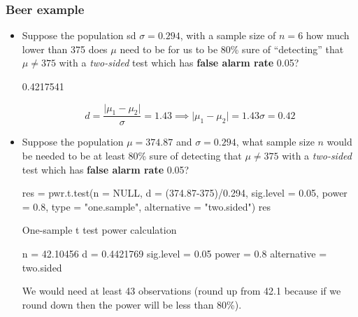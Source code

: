 \documentclass[a4paper]{article}\usepackage[]{graphicx}\usepackage[]{xcolor}
\begin{document}
\subsubsection{Beer example}
\begin{itemize}
	\item Suppose the population sd \( \sigma = 0.294 \), with a sample size of \( n = 6 \) how much lower than 375 does \textcolor{myred}{\( \mu \)} need to be for us to be 80\% sure of ``detecting'' that \textcolor{myred}{\( \mu \neq 375 \)} with a \textit{two-sided} test which has \textbf{false alarm rate} 0.05?
\begin{Schunk}
\begin{Soutput}
[1] 0.4217541
\end{Soutput}
\end{Schunk}
\[
	d = \frac{\lvert \mu_1 - \mu_2 \rvert}{\sigma} = 1.43 \implies \lvert \mu_1 - \mu_2 \rvert = 1.43\sigma = 0.42
\]
	\item Suppose the population  \textcolor{myred}{\( \mu = 374.87 \)} and \( \sigma = 0.294 \), what sample size \( n \) would be needed to be at least 80\% sure of detecting that \( \mu \neq 375 \) with a \textit{two-sided} test which has \textbf{false alarm rate} 0.05?
\begin{Schunk}
\begin{Sinput}
res = pwr.t.test(n = NULL,
                 d = (374.87-375)/0.294, 
                 sig.level = 0.05,
                 power = 0.8, 
                 type = "one.sample", 
                 alternative = "two.sided")
res
\end{Sinput}
\begin{Soutput}

     One-sample t test power calculation 

              n = 42.10456
              d = 0.4421769
      sig.level = 0.05
          power = 0.8
    alternative = two.sided
\end{Soutput}
\end{Schunk}
We would need at least 43 observations (round up from 42.1 because if we round down then the power will be less than 80\%).
\end{itemize}
\end{document}
